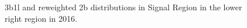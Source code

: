 \begin{figure}[ht]
 
 
    \caption{3b1l and reweighted 2b distributions in Signal Region in the lower right region in 2016.}
    \label{fig:lower-right-3b1l-SR-2016}
\end{figure}


